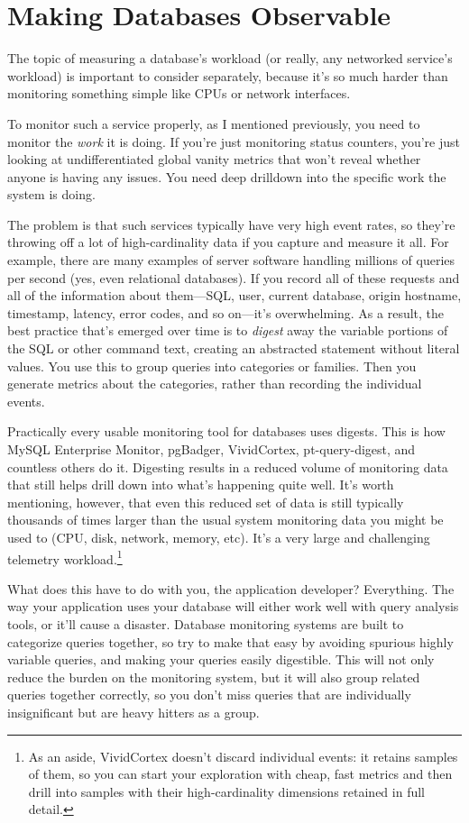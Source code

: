 \documentclass{vivid_layout}
\begin{document}
\section{Making Databases Observable}

The topic of measuring a database's workload (or really, any networked
service's workload) is important to consider separately, because it's so much
harder than monitoring something simple like CPUs or network interfaces.

To monitor such a service properly, as I mentioned previously, you need to
monitor the \emph{work} it is doing. If you're just monitoring status counters,
you're just looking at undifferentiated global vanity metrics that won't
reveal whether anyone is having any issues. You need deep drilldown into
the specific work the system is doing.

The problem is that such services typically have very high event rates, so
they're throwing off a lot of high-cardinality data if you capture and measure
it all. For example, there are many examples of server software handling
millions of queries per second (yes, even relational databases). If you record
all of these requests and all of the information about them---SQL, user, current
database, origin hostname, timestamp, latency, error codes, and so on---it's 
overwhelming. As a result, the best practice that's emerged over time is to
\emph{digest} away the variable portions of the SQL or other command text,
creating an abstracted statement without literal values. You use this to
group queries into categories or families. Then you generate metrics about the
categories, rather than recording the individual events.

Practically every usable monitoring tool for databases uses digests. This is how
MySQL Enterprise Monitor, pgBadger, VividCortex, pt-query-digest, and countless
others do it. Digesting results in a reduced volume of monitoring data that still
helps drill down into what's happening quite well. It's worth mentioning,
however, that even this reduced set of data is still typically thousands of
times larger than the usual system monitoring data you might be used to (CPU,
disk, network, memory, etc). It's a very large and challenging telemetry
workload.\footnote{As an aside, VividCortex doesn't discard individual events: it retains samples of them, so you can start your exploration with cheap, fast metrics and then drill into samples with their high-cardinality dimensions retained in full detail.}

What does this have to do with you, the application developer? Everything. The
way your application uses your database will either work well with query
analysis tools, or it'll cause a disaster.  Database monitoring systems
are built to categorize queries together, so try to make that easy by avoiding
spurious highly variable queries, and making your queries easily
digestible. This will not only reduce the burden on the monitoring system, but
it will also group related queries together correctly, so you don't miss queries
that are individually insignificant but are heavy hitters as a group.
\end{document}
